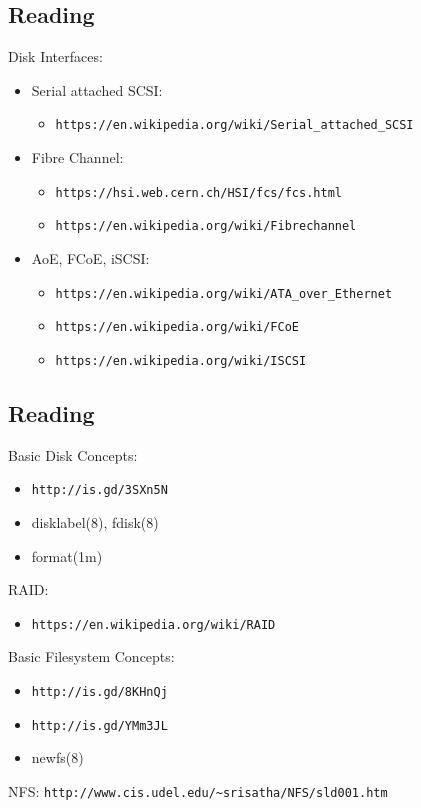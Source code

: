 \documentclass[xga]{xdvislides}
\begin{document}
\subsection{Reading}
Disk Interfaces:
\begin{itemize}
	\item Serial attached SCSI:
		\begin{itemize}
			\item \verb+https://en.wikipedia.org/wiki/Serial_attached_SCSI+
		\end{itemize}
	\item Fibre Channel:
		\begin{itemize}
			\item \verb+https://hsi.web.cern.ch/HSI/fcs/fcs.html+
			\item \verb+https://en.wikipedia.org/wiki/Fibrechannel+
		\end{itemize}
	\item AoE, FCoE, iSCSI:
		\begin{itemize}
			\item \verb+https://en.wikipedia.org/wiki/ATA_over_Ethernet+
			\item \verb+https://en.wikipedia.org/wiki/FCoE+
			\item \verb+https://en.wikipedia.org/wiki/ISCSI+
		\end{itemize}
\end{itemize}

\subsection{Reading}
Basic Disk Concepts:
\begin{itemize}
	\item \verb+http://is.gd/3SXn5N+
	\item disklabel(8), fdisk(8)
	\item format(1m)
\end{itemize}
RAID:
\begin{itemize}
	\item \verb+https://en.wikipedia.org/wiki/RAID+
\end{itemize}
Basic Filesystem Concepts:
\begin{itemize}
	\item \verb+http://is.gd/8KHnQj+
	\item \verb+http://is.gd/YMm3JL+
	\item newfs(8)
\end{itemize}
NFS: \verb+http://www.cis.udel.edu/~srisatha/NFS/sld001.htm+
\end{document}
